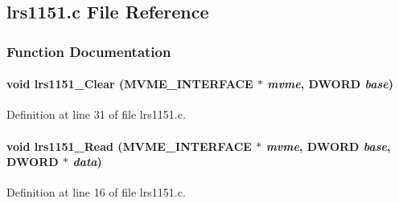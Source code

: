 \subsection{lrs1151.c File Reference}
\label{lrs1151_8c}


\subsubsection{Function Documentation}
\paragraph[{lrs1151\_\-Clear}]{\setlength{\rightskip}{0pt plus 5cm}void lrs1151\_\-Clear ({\bf MVME\_\-INTERFACE} $\ast$ {\em mvme}, \/  {\bf DWORD} {\em base})}\hfill\label{lrs1151_8c_afd41b5af4f3ccc002e70b07380695c08}


Definition at line 31 of file lrs1151.c.
\paragraph[{lrs1151\_\-Read}]{\setlength{\rightskip}{0pt plus 5cm}void lrs1151\_\-Read ({\bf MVME\_\-INTERFACE} $\ast$ {\em mvme}, \/  {\bf DWORD} {\em base}, \/  {\bf DWORD} $\ast$ {\em data})}\hfill\label{lrs1151_8c_afba12c8d0f6c8b0194efb2dc53aa01d6}


Definition at line 16 of file lrs1151.c.